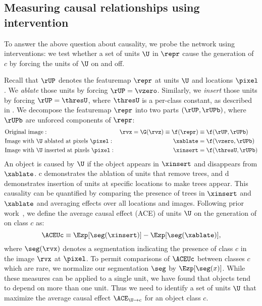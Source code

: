 \documentclass{article} %
\begin{document}
\subsection{Measuring causal relationships using intervention}
To answer the above question about causality, we probe the network using interventions: we test whether a set of units $\U$ in $\repr$ cause the generation of $c$ by forcing the units of $\U$ on and off.

Recall that $\rUP$ denotes the featuremap $\repr$ at units $\U$  and locations $\pixel$.  We \textit{ablate} those units by forcing $\rUP = \vzero$. Similarly, we \textit{insert} those units by forcing $\rUP = \thresU$, where $\thresU$ is a per-class constant, as described in .
We decompose the featuremap $\repr$ into two parts $(\rUP, \rUPb)$, where $\rUPb$ are unforced components of $\repr$:
\vspace{-5pt}\begin{align}
\label{eq:intervention}
&\text{Original image}: &\rvx = \G(\rvz)  \equiv  \f(\repr) & \equiv  \f(\rUP, \rUPb) \\ \nonumber
&\text{Image with $\U$ ablated at pixels $\pixel$}: & \xablate & =  \f(\vzero, \rUPb) \\ \nonumber
&\text{Image with $\U$ inserted at pixels $\pixel$}: & \xinsert & = \f(\thresU, \rUPb)
\end{align}
An object is caused by $\U$ if the object appears in $\xinsert$ and disappears from $\xablate$.  c demonstrates the ablation of units that remove trees, and  d demonstrates insertion of units at specific locations to make trees appear.  This causality can be quantified by comparing the presence of trees in $\xinsert$ and $\xablate$ and averaging effects over all locations and images.  Following prior work~\citep{holland1988causal,pearl2009causality},
 we define the average causal effect (ACE) of units $\U$ on the generation of on class $c$ as:
\begin{equation}
\ACEUc  \equiv \Ezp[\seg(\xinsert)] - \Ezp[\seg(\xablate)],
\end{equation}
where $\seg(\rvx)$ denotes a segmentation indicating the presence of class $c$ in the image $\rvx$ at $\pixel$.
To permit comparisons of $\ACEUc$ between classes $c$ which are rare, we normalize our segmentation $\seg$ by $\Ezp[\seg(x)]$.  While these measures can be applied to a single unit, we have found that objects tend to depend on more than one unit. Thus we need to identify a set of units $\U$ that maximize the average causal effect $\ACE_{\U\rightarrow c}$ for an object class $c$.
\end{document}
